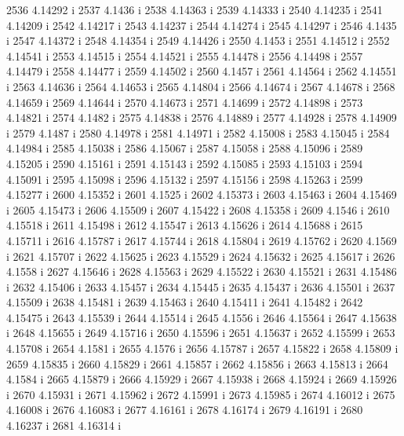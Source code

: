  2536  4.14292  i
 2537  4.1436  i
 2538  4.14363  i
 2539  4.14333  i
 2540  4.14235  i
 2541  4.14209  i
 2542  4.14217  i
 2543  4.14237  i
 2544  4.14274  i
 2545  4.14297  i
 2546  4.1435  i
 2547  4.14372  i
 2548  4.14354  i
 2549  4.14426  i
 2550  4.1453  i
 2551  4.14512  i
 2552  4.14541  i
 2553  4.14515  i
 2554  4.14521  i
 2555  4.14478  i
 2556  4.14498  i
 2557  4.14479  i
 2558  4.14477  i
 2559  4.14502  i
 2560  4.1457  i
 2561  4.14564  i
 2562  4.14551  i
 2563  4.14636  i
 2564  4.14653  i
 2565  4.14804  i
 2566  4.14674  i
 2567  4.14678  i
 2568  4.14659  i
 2569  4.14644  i
 2570  4.14673  i
 2571  4.14699  i
 2572  4.14898  i
 2573  4.14821  i
 2574  4.1482  i
 2575  4.14838  i
 2576  4.14889  i
 2577  4.14928  i
 2578  4.14909  i
 2579  4.1487  i
 2580  4.14978  i
 2581  4.14971  i
 2582  4.15008  i
 2583  4.15045  i
 2584  4.14984  i
 2585  4.15038  i
 2586  4.15067  i
 2587  4.15058  i
 2588  4.15096  i
 2589  4.15205  i
 2590  4.15161  i
 2591  4.15143  i
 2592  4.15085  i
 2593  4.15103  i
 2594  4.15091  i
 2595  4.15098  i
 2596  4.15132  i
 2597  4.15156  i
 2598  4.15263  i
 2599  4.15277  i
 2600  4.15352  i
 2601  4.1525  i
 2602  4.15373  i
 2603  4.15463  i
 2604  4.15469  i
 2605  4.15473  i
 2606  4.15509  i
 2607  4.15422  i
 2608  4.15358  i
 2609  4.1546  i
 2610  4.15518  i
 2611  4.15498  i
 2612  4.15547  i
 2613  4.15626  i
 2614  4.15688  i
 2615  4.15711  i
 2616  4.15787  i
 2617  4.15744  i
 2618  4.15804  i
 2619  4.15762  i
 2620  4.1569  i
 2621  4.15707  i
 2622  4.15625  i
 2623  4.15529  i
 2624  4.15632  i
 2625  4.15617  i
 2626  4.1558  i
 2627  4.15646  i
 2628  4.15563  i
 2629  4.15522  i
 2630  4.15521  i
 2631  4.15486  i
 2632  4.15406  i
 2633  4.15457  i
 2634  4.15445  i
 2635  4.15437  i
 2636  4.15501  i
 2637  4.15509  i
 2638  4.15481  i
 2639  4.15463  i
 2640  4.15411  i
 2641  4.15482  i
 2642  4.15475  i
 2643  4.15539  i
 2644  4.15514  i
 2645  4.1556  i
 2646  4.15564  i
 2647  4.15638  i
 2648  4.15655  i
 2649  4.15716  i
 2650  4.15596  i
 2651  4.15637  i
 2652  4.15599  i
 2653  4.15708  i
 2654  4.1581  i
 2655  4.1576  i
 2656  4.15787  i
 2657  4.15822  i
 2658  4.15809  i
 2659  4.15835  i
 2660  4.15829  i
 2661  4.15857  i
 2662  4.15856  i
 2663  4.15813  i
 2664  4.1584  i
 2665  4.15879  i
 2666  4.15929  i
 2667  4.15938  i
 2668  4.15924  i
 2669  4.15926  i
 2670  4.15931  i
 2671  4.15962  i
 2672  4.15991  i
 2673  4.15985  i
 2674  4.16012  i
 2675  4.16008  i
 2676  4.16083  i
 2677  4.16161  i
 2678  4.16174  i
 2679  4.16191  i
 2680  4.16237  i
 2681  4.16314  i
